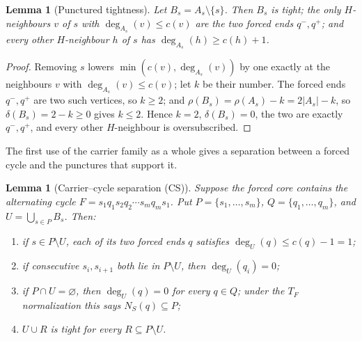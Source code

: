 \documentclass[11pt]{article}
\theoremstyle{plain}
\newtheorem{lemma}[theorem]{Lemma}
\theoremstyle{definition}
\begin{document}
\begin{lemma}[Punctured tightness]\label{lem:punct}
Let $B_s=A_s\setminus\{s\}$. Then $B_s$ is tight; the only $H$-neighbours $v$ of
$s$ with $\deg_{A_s}(v)\le c(v)$ are the two forced ends $q^-,q^+$; and every
other $H$-neighbour $h$ of $s$ has $\deg_{A_s}(h)\ge c(h)+1$.
\end{lemma}

\begin{proof}
Removing $s$ lowers $\min(c(v),\deg_{A_s}(v))$ by one exactly at the neighbours
$v$ with $\deg_{A_s}(v)\le c(v)$; let $k$ be their number. The forced ends
$q^-,q^+$ are two such vertices, so $k\ge2$; and
$\rho(B_s)=\rho(A_s)-k=2|A_s|-k$, so $\delta(B_s)=2-k\ge0$ gives $k\le2$. Hence
$k=2$, $\delta(B_s)=0$, the two are exactly $q^-,q^+$, and every other
$H$-neighbour is oversubscribed.
\end{proof}

The first use of the carrier family as a whole gives a separation between a
forced cycle and the punctures that support it.

\begin{lemma}[Carrier--cycle separation (CS)]\label{lem:CS}
Suppose the forced core contains the alternating cycle
$F=s_1q_1s_2q_2\cdots s_mq_ms_1$.  Put
$P=\{s_1,\ldots,s_m\}$, $Q=\{q_1,\ldots,q_m\}$, and
$U=\bigcup_{s\in P}B_s$.  Then:
\begin{enumerate}
\item[(a)] if $s\in P\setminus U$, each of its two forced ends $q$ satisfies
$\deg_U(q)\le c(q)-1=1$;
\item[(b)] if consecutive $s_i,s_{i+1}$ both lie in $P\setminus U$, then
$\deg_U(q_i)=0$;
\item[(c)] if $P\cap U=\varnothing$, then $\deg_U(q)=0$ for every $q\in Q$;
under the $T_F$ normalization this says $N_S(q)\subseteq P$;
\item[(d)] $U\cup R$ is tight for every $R\subseteq P\setminus U$.
\end{enumerate}
\end{lemma}
\end{document}
